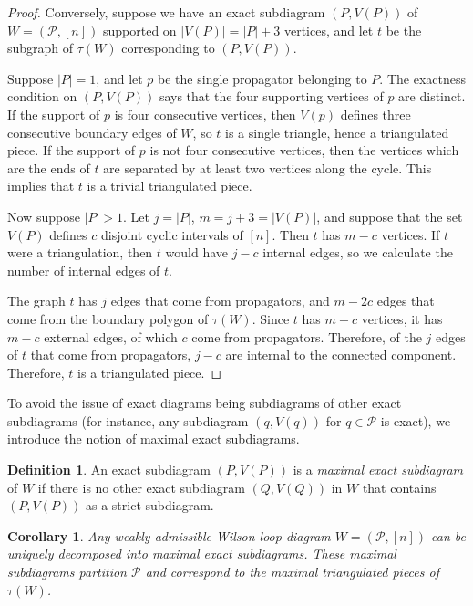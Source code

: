 \documentclass[11pt]{article}
\newcommand{\cP}{\mathcal{P}}
\newtheorem{cor}[thm]{Corollary}
\theoremstyle{remark}
\theoremstyle{definition}
\newtheorem{dfn}[thm]{Definition}
\begin{document}
\begin{proof}
Conversely, suppose we have an exact subdiagram $(P, V(P))$ of $W = (\cP, [n])$ supported on $|V(P)| = |P|+3$ vertices, and let $t$ be the subgraph of $\tau(W)$ corresponding to $(P,V(P))$.

Suppose $|P|=1$, and let $p$ be the single propagator belonging to $P$. The exactness condition on $(P, V(P))$ says that the four supporting vertices of $p$ are distinct.  If the support of $p$ is four consecutive vertices, then $V(p)$ defines three consecutive boundary edges of $W$, so $t$ is a single triangle, hence a triangulated piece.  If the support of $p$ is not four consecutive vertices, then the vertices which are the ends of $t$ are separated by at least two vertices along the cycle.  This implies that $t$ is a trivial triangulated piece.

Now suppose $|P|>1$.  Let $j=|P|$, $m= j+3=|V(P)|$, and 
suppose that the set $V(P)$ defines $c$ disjoint cyclic intervals of $[n]$. Then $t$ has $m-c$ vertices.  If $t$ were a triangulation, then $t$ would have $j -c$ internal edges, so we calculate the number of internal edges of $t$.

The graph $t$ has $j$ edges that come from propagators, and $m - 2c$ edges that come from the boundary polygon of $\tau(W)$. Since $t$ has $m-c$ vertices, it has $m-c$ external edges, of which $c$ come from propagators. Therefore, of the $j$ edges of $t$ that come from propagators, $j-c$ are internal to the connected component. Therefore, $t$ is a triangulated piece.


\end{proof}





To avoid the issue of exact diagrams being subdiagrams of other exact subdiagrams (for instance, any subdiagram $(q, V(q))$ for $q \in \cP$ is exact), we introduce the notion of maximal exact subdiagrams.

\begin{dfn}
An exact subdiagram $(P, V(P))$ is a {\em maximal exact subdiagram} of $W$ if there is no other exact subdiagram $(Q, V(Q))$ in $W$ that contains $(P,V(P))$ as a strict subdiagram.
\end{dfn}

\begin{cor} \label{uniqueproppartitioncor}
Any weakly admissible Wilson loop diagram $W = (\cP, [n])$ can be uniquely decomposed into maximal exact subdiagrams. These maximal subdiagrams partition $\cP$ and correspond to the maximal triangulated pieces of $\tau(W)$.
\end{cor}
\end{document}
